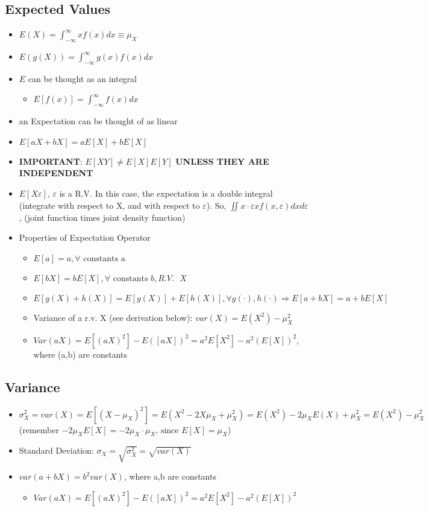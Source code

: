 \documentclass[10pt, oneside]{article}
\begin{document}
\subsection{Expected Values}
\begin{itemize}
    \item $E(X)=\int_{-\infty}^{\infty} xf(x)dx\equiv \mu_X$
    \item $E(g(X))=\int_{-\infty}^{\infty} g(x)f(x)dx$
    \item $E$ can be thought as an integral
    \begin{itemize}
        \item $E[f(x)] =\int_{-\infty}^{\infty} f(x)dx$
    \end{itemize}
    \item an Expectation can be thought of as linear
    \item $E[aX+bX] = aE[X] + bE[X]$
    \item \textbf{IMPORTANT}: $E[XY] \neq E[X]E[Y]$ \textbf{UNLESS THEY ARE INDEPENDENT}
    \item $E[X\varepsilon]$, $\varepsilon$ is a R.V. In this case, the expectation is a double integral (integrate with respect to X, and with respect to $\varepsilon$). So, $\iint x\cdot \varepsilon x    f(x,\varepsilon)dxd\varepsilon$, (joint function times joint density function)
    \item Properties of Expectation Operator
    \begin{itemize}
        \item $E[a] = a, \forall \text{ constants a}$
        \item $E[bX] = bE[X], \forall \text{ constants } b, R.V.\text{ }X$
        \item $E[g(X) + h(X)] = E[g(X)] + E[h(X)], \forall g(\cdot), h(\cdot) \Rightarrow E[a+bX]=a+bE[X]$
        \item Variance of a r.v. X (see derivation below): $var(X)=E(X^2)-\mu_X ^2$ 
        \item $Var(aX)=E[(aX)^2]-E([aX])^2=a^2 E[X^2]-a^2(E[X])^2$, where (a,b) are constants
    \end{itemize}
\end{itemize}
\subsection{Variance}
\begin{itemize}
    \item $\sigma^2 _X = var(X)=E[(X-\mu_X)^2]=E(X^2-2X\mu_X+\mu^2_X)=E(X^2)-2\mu_X E(X)+\mu^2 _X = E(X^2)-\mu^2_X$ (remember $-2\mu_X E[X] = -2\mu_X \cdot \mu_X\text{, since } E[X] = \mu_X$)
    \item Standard Deviation: $\sigma_X=\sqrt{\sigma^2 _X}=\sqrt{var(X)}$
    \item $var(a+bX) =b^2var(X)$, where a,b are constants
    \begin{itemize}
        \item $Var(aX)=E[(aX)^2]-E([aX])^2=a^2 E[X^2]-a^2(E[X])^2$
    \end{itemize}
\end{itemize}
\end{document}

